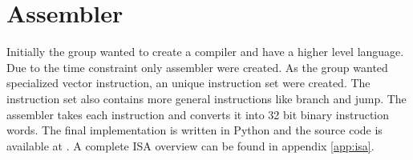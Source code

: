 \section{Assembler}
Initially the group wanted to create a compiler and have a higher level language.
Due to the time constraint only assembler were created.
As the group wanted specialized vector instruction, an unique instruction set were created.
The instruction set also contains more general instructions like branch and jump.
The assembler takes each instruction and converts it into 32 bit binary instruction words.
The final implementation is written in Python and the source code is available at \cite{assembler}.
A complete ISA overview can be found in appendix \ref{app:isa}.
